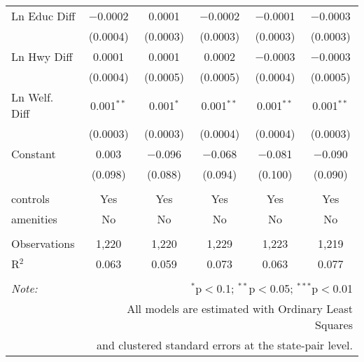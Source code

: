 \begin{table}[!htbp]
\begin{tabular}{@{\extracolsep{5pt}}lccccc}
  Ln Educ Diff & $-$0.0002 & 0.0001 & $-$0.0002 & $-$0.0001 & $-$0.0003 \\ 
  & (0.0004) & (0.0003) & (0.0003) & (0.0003) & (0.0003) \\ 
  Ln Hwy Diff & 0.0001 & 0.0001 & 0.0002 & $-$0.0003 & $-$0.0003 \\ 
  & (0.0004) & (0.0005) & (0.0005) & (0.0004) & (0.0005) \\ 
  Ln Welf. Diff & 0.001$^{**}$ & 0.001$^{*}$ & 0.001$^{**}$ & 0.001$^{**}$ & 0.001$^{**}$ \\ 
  & (0.0003) & (0.0003) & (0.0004) & (0.0004) & (0.0003) \\ 
  Constant & 0.003 & $-$0.096 & $-$0.068 & $-$0.081 & $-$0.090 \\ 
  & (0.098) & (0.088) & (0.094) & (0.100) & (0.090) \\ 
 \hline \\[-1.8ex] 
controls & Yes & Yes & Yes & Yes & Yes \\ 
amenities & No & No & No & No & No \\ 
\hline \\[-1.8ex] 
Observations & 1,220 & 1,220 & 1,229 & 1,223 & 1,219 \\ 
R$^{2}$ & 0.063 & 0.059 & 0.073 & 0.063 & 0.077 \\ 
\hline 
\hline \\[-1.8ex] 
\textit{Note:}  & \multicolumn{5}{r}{$^{*}$p$<$0.1; $^{**}$p$<$0.05; $^{***}$p$<$0.01} \\ 
 & \multicolumn{5}{r}{All models are estimated with Ordinary Least Squares} \\ 
 & \multicolumn{5}{r}{and clustered standard errors at the state-pair level.} \\ 
\end{tabular} 
\end{table} 
